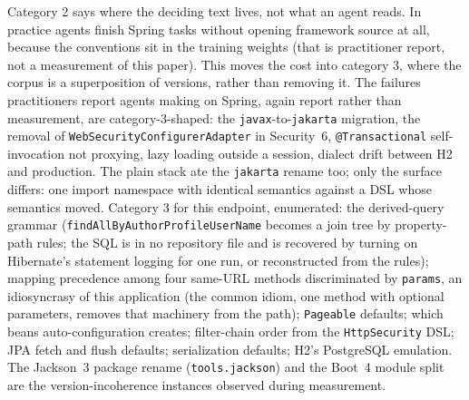 \documentclass[journal]{IEEEtran}
\begin{document}
Category 2 says where the deciding text lives, not what an agent reads. In
practice agents finish Spring tasks without opening framework source at all,
because the conventions sit in the training weights (that is practitioner
report, not a measurement of this paper). This moves the cost into
category 3, where the corpus is a superposition of versions, rather than
removing it. The failures practitioners report agents making on Spring, again
report rather than measurement, are category-3-shaped: the \texttt{javax}-to-\texttt{jakarta}
migration, the removal of \texttt{WebSecurityConfigurerAdapter} in
Security~6, \texttt{@Transactional} self-invocation not proxying, lazy
loading outside a session, dialect drift between H2 and production. The
plain stack ate the \texttt{jakarta} rename too; only the surface differs: one import
namespace with identical semantics against a DSL whose semantics moved. Category 3 for this endpoint, enumerated: the derived-query grammar
(\texttt{findAllByAuthorProfileUserName} becomes a join tree by property-path
rules; the SQL is in no repository file and is recovered by turning on
Hibernate's statement logging for one run, or reconstructed from the rules);
mapping precedence among four same-URL methods discriminated by
\texttt{params}, an idiosyncrasy of this application (the common idiom, one
method with optional parameters, removes that machinery from the path);
\texttt{Pageable} defaults; which beans auto-configuration creates;
filter-chain order from the \texttt{HttpSecurity} DSL; JPA fetch and flush
defaults; serialization defaults; H2's PostgreSQL emulation. The Jackson~3
package rename (\texttt{tools.jackson}) and the Boot~4 module split are the
version-incoherence instances observed during measurement.
\end{document}
